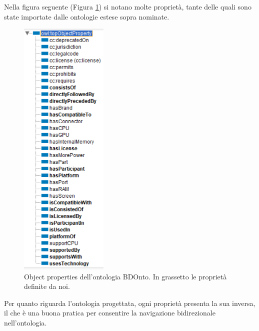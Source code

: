 Nella figura seguente (Figura \ref*{fig:proprieta_bdonto}) si notano molte proprietà, tante delle quali sono state importate dalle ontologie estese sopra nominate.
\begin{figure}[H]
    \centering
    \includegraphics[width=4.2cm]{docs/images/datapropWS.PNG}
    \caption{Object properties dell'ontologia BDOnto. In grassetto le proprietà definite da noi.}
    \label{fig:proprieta_bdonto}
\end{figure}

Per quanto riguarda l'ontologia progettata, ogni proprietà presenta la sua inversa, il che è una buona pratica per consentire la navigazione bidirezionale nell'ontologia.\\

